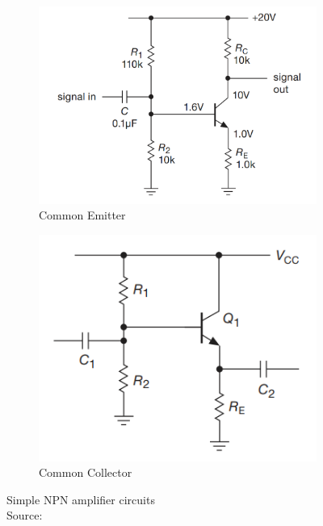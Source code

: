 \documentclass[conference]{IEEEtran}
\begin{document}
\begin{figure}[htbp]
    \centering
    \begin{subfigure}[b]{0.3\textwidth}
        \centerline{\includegraphics[width=\textwidth]{figures/NPN_CE-pic.png}}
        \caption{Common Emitter}
        \label{fig:NPN-CE-fig}
    \end{subfigure}
    \begin{subfigure}[b]{0.25\textwidth}
        \centerline{\includegraphics[width=\textwidth]{figures/NPN_CC-pic.png}}
        \caption{Common Collector}
        \label{fig:NPN-CC-fig}
    \end{subfigure}
    \caption{Simple NPN amplifier circuits \\ Source: \cite{horowitz_art_2015}}
\end{figure}
\end{document}
